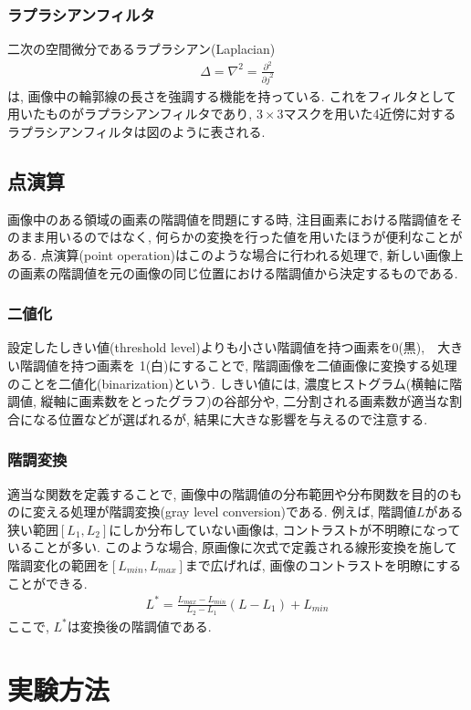\documentclass[a4paper,11pt,uplatex, titlepage]{jsarticle}
\begin{document}
\subsubsection{ラプラシアンフィルタ}
二次の空間微分であるラプラシアン(Laplacian)
\begin{align}
  \Delta = \nabla^{2} = \frac{\partial^{2}}{\partial j^{2}}
\end{align}
は, 画像中の輪郭線の長さを強調する機能を持っている. これをフィルタとして用いたものがラプラシアンフィルタであり,
$3\times3$マスクを用いた4近傍に対するラプラシアンフィルタは図のように表される.
\subsection{点演算}
画像中のある領域の画素の階調値を問題にする時, 注目画素における階調値をそのまま用いるのではなく,
何らかの変換を行った値を用いたほうが便利なことがある. 点演算(point operation)はこのような場合に行われる処理で,
新しい画像上の画素の階調値を元の画像の同じ位置における階調値から決定するものである.
\subsubsection{二値化}
設定したしきい値(threshold level)よりも小さい階調値を持つ画素を0(黒),　大きい階調値を持つ画素を
1(白)にすることで, 階調画像を二値画像に変換する処理のことを二値化(binarization)という.
しきい値には, 濃度ヒストグラム(横軸に階調値, 縦軸に画素数をとったグラフ)の谷部分や, 二分割される画素数が適当な割合になる位置などが選ばれるが,
結果に大きな影響を与えるので注意する.
\subsubsection{階調変換}
適当な関数を定義することで, 画像中の階調値の分布範囲や分布関数を目的のものに変える処理が階調変換(gray level conversion)である.
例えば, 階調値$L$がある狭い範囲$[L_1,L_2]$にしか分布していない画像は, コントラストが不明瞭になっていることが多い.
このような場合, 原画像に次式で定義される線形変換を施して階調変化の範囲を$[L_{min},L_{max}]$まで広げれば, 画像のコントラストを明瞭にすることができる.
\begin{align}
  L^{*} = \frac{L_{max}-L_{min}}{L_2-L_1}(L-L_1)+L_{min}
\end{align}
ここで, $L^{*}$は変換後の階調値である.

\section{実験方法}
\end{document}
